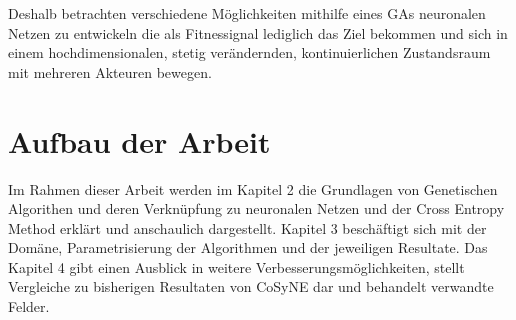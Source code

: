 \noindent
Deshalb betrachten verschiedene Möglichkeiten mithilfe eines GAs neuronalen Netzen zu entwickeln die als Fitnessignal lediglich das Ziel bekommen und sich in einem hochdimensionalen, stetig verändernden, kontinuierlichen Zustandsraum mit mehreren Akteuren bewegen.


\section{Aufbau der Arbeit}


Im Rahmen dieser Arbeit werden im Kapitel 2 die Grundlagen von Genetischen Algorithen und deren Verknüpfung zu neuronalen Netzen und der Cross Entropy Method erklärt und anschaulich dargestellt. Kapitel 3 beschäftigt sich mit der Domäne, Parametrisierung der Algorithmen und der jeweiligen Resultate. Das Kapitel 4 gibt einen Ausblick in weitere Verbesserungsmöglichkeiten, stellt Vergleiche zu bisherigen Resultaten von CoSyNE dar und behandelt verwandte Felder. 

